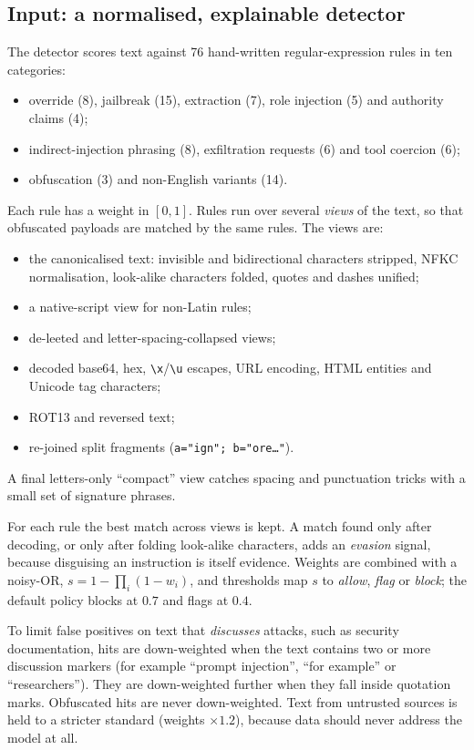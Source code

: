 \documentclass[10pt]{article}
\begin{document}
\subsection{Input: a normalised, explainable detector}
The detector scores text against 76 hand-written regular-expression rules in ten categories:
\begin{itemize}
\item override (8), jailbreak (15), extraction (7), role injection (5) and authority claims (4);
\item indirect-injection phrasing (8), exfiltration requests (6) and tool coercion (6);
\item obfuscation (3) and non-English variants (14).
\end{itemize}
Each rule has a weight in $[0,1]$. Rules run over several \emph{views} of the text, so that obfuscated payloads are matched by the same rules. The views are:
\begin{itemize}
\item the canonicalised text: invisible and bidirectional characters stripped, NFKC normalisation, look-alike characters folded, quotes and dashes unified;
\item a native-script view for non-Latin rules;
\item de-leeted and letter-spacing-collapsed views;
\item decoded base64, hex, \verb|\x|/\verb|\u| escapes, URL encoding, HTML entities and Unicode tag characters;
\item ROT13 and reversed text;
\item re-joined split fragments (\texttt{a="ign"; b="ore\dots"}).
\end{itemize}
A final letters-only ``compact'' view catches spacing and punctuation tricks with a small set of signature phrases.

For each rule the best match across views is kept. A match found only after decoding, or only after folding look-alike characters, adds an \emph{evasion} signal, because disguising an instruction is itself evidence. Weights are combined with a noisy-OR, $s = 1 - \prod_i (1 - w_i)$, and thresholds map $s$ to \emph{allow}, \emph{flag} or \emph{block}; the default policy blocks at $0.7$ and flags at $0.4$.

To limit false positives on text that \emph{discusses} attacks, such as security documentation, hits are down-weighted when the text contains two or more discussion markers (for example ``prompt injection'', ``for example'' or ``researchers''). They are down-weighted further when they fall inside quotation marks. Obfuscated hits are never down-weighted. Text from untrusted sources is held to a stricter standard (weights $\times 1.2$), because data should never address the model at all.
\end{document}
